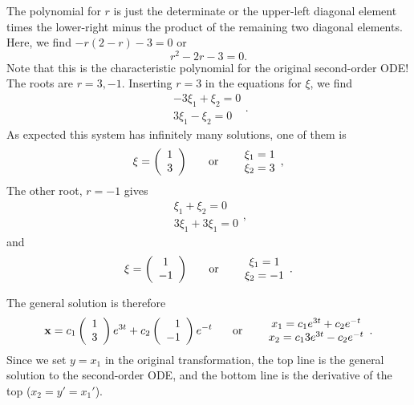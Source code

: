 \documentclass[leqno,DIV=calc,paper=a4,fontsize=11pt]{article}
\theoremstyle{definition}
\theoremstyle{plain}
\theoremstyle{remark}
\begin{document}
The polynomial for  $r$ is just the determinate or the upper-left
diagonal element times the lower-right minus the product of the
remaining two diagonal elements. Here, we find $-r(2-r)-3=0$ or
\[
r^2-2r-3=0.
\]
Note that this is the characteristic polynomial for the original
second-order ODE! The roots are $r=3,-1$. Inserting $r=3$ in the
equations for $\xi$, we find
\[
\begin{array}{c}-3\xi_1+\xi_2=0\\3\xi_1-\xi_2=0\end{array}.
\]
As expected this system has infinitely many solutions, one of them is
\[
{\bf \xi} = \left(\begin{array}{c}1\\3\end{array}\right)
\hspace{.25in} \mbox{or} \hspace{.25in}
\begin{array}{c}\xi_1=1\\\xi_2=3\end{array},
\]
The other root, $r=-1$ gives
\[
\begin{array}{c}\xi_1+\xi_2=0\\3\xi_1+3\xi_1=0\end{array},
\]
and
\[
{\bf \xi} = \left(\begin{array}{c}1\\-1\end{array}\right)
\hspace{.25in} \mbox{or} \hspace{.25in}
\begin{array}{c}\xi_1=1\\\xi_2=-1\end{array}.
\]

The general solution is therefore
\[
{\bf x}=c_1\left(\begin{array}{c}1\\3\end{array}\right)e^{3t}
+c_2\left(\begin{array}{r}1\\-1\end{array}\right)e^{-t}
\hspace{.25in} \mbox{or} \hspace{.25in}
\begin{array}{c}x_1=c_1e^{3t}+c_2e^{-t}\\x_2=c_13e^{3t}-c_2e^{-t}\end{array}.
\]
Since we set $y=x_1$ in the original transformation, the top line is
the general solution to the second-order ODE, and the bottom line is the
derivative of the top ($x_2=y'=x_1'$).
\end{document}
